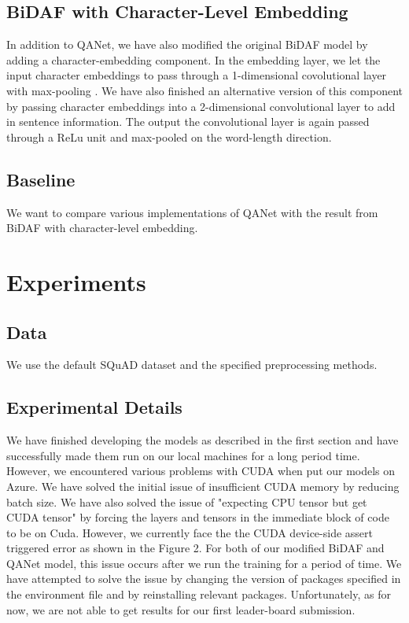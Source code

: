 \documentclass{article}
\begin{document}
\subsection{BiDAF with Character-Level Embedding}
In addition to QANet, we have also modified the original BiDAF model by adding a character-embedding component. In the embedding layer, we let the input character embeddings to pass through a 1-dimensional covolutional layer with max-pooling \cite{SEO}. We have also finished an alternative version of this component by passing character embeddings into a 2-dimensional convolutional layer to add in sentence information. The output the convolutional layer is again passed through a ReLu unit and max-pooled on the word-length direction.   
\subsection{Baseline}
We want to compare various implementations of QANet with the result from BiDAF with character-level embedding. 

\section{Experiments}
\subsection{Data}
We use the default SQuAD dataset and the specified preprocessing methods.

\subsection{Experimental Details}
We have finished developing the models as described in the first section and have successfully made them run on our local machines for a long period time. However, we encountered various problems with CUDA when put our models on Azure. We have solved the initial issue of insufficient CUDA memory by reducing batch size. We have also solved the issue of "expecting CPU tensor but get CUDA tensor" by forcing the layers and tensors in the immediate block of code to be on Cuda. However, we currently face the the CUDA device-side assert triggered error as shown in the Figure 2. For both of our modified BiDAF and QANet model, this issue occurs after we run the training for a period of time. We have attempted to solve the issue by changing the version of packages specified in the environment file and by reinstalling relevant packages. Unfortunately, as for now, we are not able to get results for our first leader-board submission.  
\end{document}
